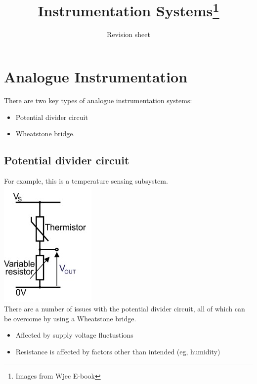 \documentclass[a4paper, 11pt, twocolumn]{article}
\title{Instrumentation Systems\footnote{Images from Wjec E-book}}
\author{Revision sheet}
\date{}
\begin{document}
    
    \maketitle
    \section{Analogue Instrumentation}
    There are two key types of analogue instrumentation systems:
    \begin{itemize}
        \item Potential divider circuit
        \item Wheatstone bridge.
    \end{itemize}
    \subsection{Potential divider circuit}
    For example, this is a temperature sensing subsystem.\\
    \includegraphics{simplePD.jpg} \\
    There are a number of issues with the potential divider circuit, all of which can be overcome by using a Wheatstone bridge.
    \begin{itemize}
        \item Affected by supply voltage fluctustions
        \item Resistance is affected by factors other than intended (eg, humidity)
    \end{itemize}
\end{document}
